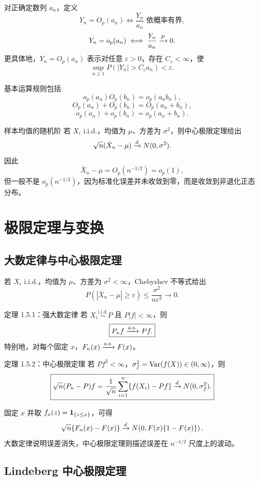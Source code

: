 对正确定数列 $a_n$，定义
\[
 Y_n=O_p(a_n)
 \iff \frac{Y_n}{a_n}\text{ 依概率有界},
\]
\[
 Y_n=o_p(a_n)
 \iff \frac{Y_n}{a_n}\xrightarrow{P}0.
\]
更具体地，$Y_n=O_p(a_n)$ 表示对任意 $\varepsilon>0$，存在 $C_\varepsilon<\infty$，使
\[
 \sup_{n\geq1}P(|Y_n|>C_\varepsilon a_n)<\varepsilon.
\]

基本运算规则包括
\[
 o_p(a_n)O_p(b_n)=o_p(a_nb_n),
\]
\[
 O_p(a_n)+O_p(b_n)=O_p(a_n+b_n),
\]
\[
 o_p(a_n)+o_p(b_n)=o_p(a_n+b_n).
\]

\begin{examplebox}{样本均值的随机阶}
若 $X_i$ i.i.d.，均值为 $\mu$、方差为 $\sigma^2$，则中心极限定理给出
\[
 \sqrt n(\bar X_n-\mu)\xrightarrow{d} N(0,\sigma^2).
\]
因此
\[
 \bar X_n-\mu=O_p(n^{-1/2})=o_p(1),
\]
但一般不是 $o_p(n^{-1/2})$，因为标准化误差并未收敛到零，而是收敛到非退化正态分布。
\end{examplebox}

\section{极限定理与变换}

\subsection{大数定律与中心极限定理}

若 $X_i$ i.i.d.，均值为 $\mu$、方差为 $\sigma^2<\infty$，Chebyshev 不等式给出
\[
 P(|\bar X_n-\mu|\geq\varepsilon)
 \leq\frac{\sigma^2}{n\varepsilon^2}\to0.
 \tag{1.5}
\]

\begin{definitionbox}{定理 1.5.1：强大数定律}
若 $X_i\overset{\mathrm{i.i.d.}}{\sim}P$ 且 $P|f|<\infty$，则
\[
 \boxed{P_nf\xrightarrow{\mathrm{a.s.}} Pf.}
\]
特别地，对每个固定 $x$，$F_n(x)\xrightarrow{\mathrm{a.s.}} F(x)$。
\end{definitionbox}

\begin{definitionbox}{定理 1.5.2：中心极限定理}
若 $Pf^2<\infty$，$\sigma_f^2=\operatorname{Var}(f(X))\in(0,\infty)$，则
\[
 \boxed{
 \sqrt n(P_n-P)f
 =\frac1{\sqrt n}\sum_{i=1}^n\{f(X_i)-Pf\}
 \xrightarrow{d} N(0,\sigma_f^2).}
\]
\end{definitionbox}

固定 $x$ 并取 $f_x(z)=\mathbf 1_{\{z\leq x\}}$，可得
\[
 \sqrt n\{F_n(x)-F(x)\}
 \xrightarrow{d} N\!\left(0,F(x)\{1-F(x)\}\right).
\]
大数定律说明误差消失，中心极限定理则描述误差在 $n^{-1/2}$ 尺度上的波动。

\subsection{Lindeberg 中心极限定理}


